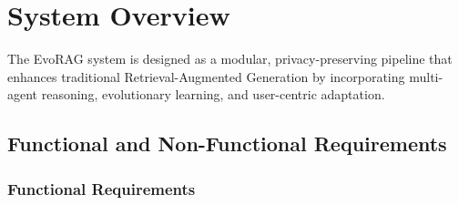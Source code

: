 
\chapter{System Overview}

The EvoRAG system is designed as a modular, privacy-preserving pipeline that enhances
traditional Retrieval-Augmented Generation by incorporating multi-agent reasoning,
evolutionary learning, and user-centric adaptation.

\section{Functional and Non-Functional Requirements}

\subsection{Functional Requirements}

